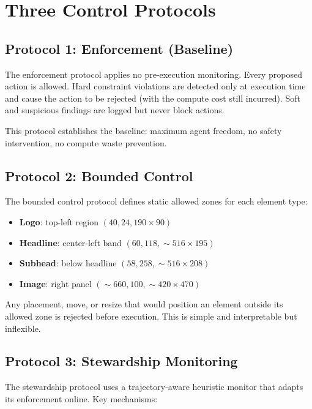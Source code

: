 \documentclass[10pt,twocolumn]{article}
\begin{document}
\section{Three Control Protocols}

\subsection{Protocol 1: Enforcement (Baseline)}

The enforcement protocol applies no pre-execution monitoring. Every proposed action is allowed. Hard constraint violations are detected only at execution time and cause the action to be rejected (with the compute cost still incurred). Soft and suspicious findings are logged but never block actions.

This protocol establishes the baseline: maximum agent freedom, no safety intervention, no compute waste prevention.

\subsection{Protocol 2: Bounded Control}

The bounded control protocol defines static allowed zones for each element type:

\begin{itemize}[leftmargin=*,itemsep=1pt]
    \item \textbf{Logo}: top-left region $(40, 24, 190 \times 90)$
    \item \textbf{Headline}: center-left band $(60, 118, {\sim}516 \times 195)$
    \item \textbf{Subhead}: below headline $(58, 258, {\sim}516 \times 208)$
    \item \textbf{Image}: right panel $({\sim}660, 100, {\sim}420 \times 470)$
\end{itemize}

Any placement, move, or resize that would position an element outside its allowed zone is rejected before execution. This is simple and interpretable but inflexible.

\subsection{Protocol 3: Stewardship Monitoring}

The stewardship protocol uses a trajectory-aware heuristic monitor that adapts its enforcement online. Key mechanisms:
\end{document}
